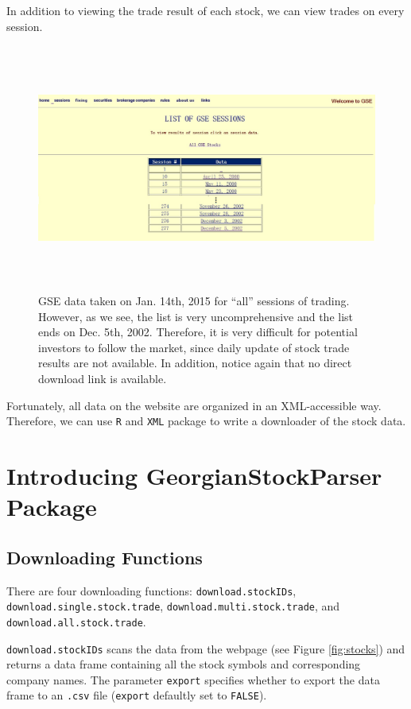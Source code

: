 \documentclass[a4paper]{article}
\begin{document}
In addition to viewing the trade result of each stock, we can view trades on every session. 

\begin{figure}[H]
\centering
\includegraphics[width=6.3in, height=3.2in]{images/sessions.jpg}
\caption{GSE data taken on Jan. 14th, 2015 for ``all'' sessions of trading. However, as we see, the list is very uncomprehensive and the list ends on Dec. 5th, 2002. Therefore, it is very difficult for potential investors to follow the market, since daily update of stock trade results are not available. In addition, notice again that no direct download link is available.}
\label{fig:sessions}
\end{figure}

Fortunately, all data on the website are organized in an XML-accessible way. Therefore, we can use \texttt{R} and \texttt{XML} package to write a downloader of the stock data.

\section{Introducing GeorgianStockParser Package}
\label{sec:package}

\subsection{Downloading Functions}
\label{subsec:functions}
There are four downloading functions: \texttt{download.stockIDs}, \texttt{download.single.stock.trade}, \texttt{download.multi.stock.trade}, and \texttt{download.all.stock.trade}.

\texttt{download.stockIDs} scans the data from the webpage (see Figure \ref{fig:stocks}) and returns a data frame containing all the stock symbols and corresponding company names. The parameter \texttt{export} specifies whether to export the data frame to an \texttt{.csv} file (\texttt{export} defaultly set to \texttt{FALSE}).
\end{document}
